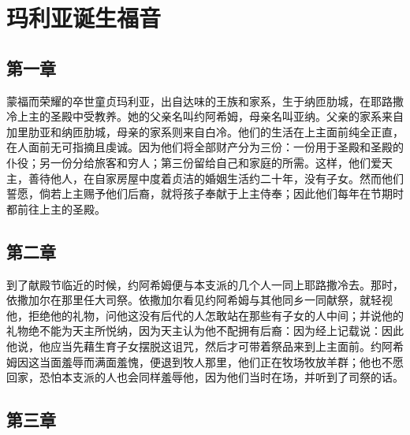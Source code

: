 
\chapter{玛利亚诞生福音}



\section{第一章}

蒙福而荣耀的卒世童贞玛利亚，出自达味的王族和家系，生于纳匝肋城，在耶路撒冷上主的圣殿中受教养。她的父亲名叫约阿希姆，母亲名叫亚纳。父亲的家系来自加里肋亚和纳匝肋城，母亲的家系则来自白冷。他们的生活在上主面前纯全正直，在人面前无可指摘且虔诚。因为他们将全部财产分为三份：一份用于圣殿和圣殿的仆役；另一份分给旅客和穷人；第三份留给自己和家庭的所需。这样，他们爱天主，善待他人，在自家房屋中度着贞洁的婚姻生活约二十年，没有子女。然而他们誓愿，倘若上主赐予他们后裔，就将孩子奉献于上主侍奉；因此他们每年在节期时都前往上主的圣殿。\par


\section{第二章}

到了献殿节临近的时候，约阿希姆便与本支派的几个人一同上耶路撒冷去。那时，依撒加尔在那里任大司祭。依撒加尔看见约阿希姆与其他同乡一同献祭，就轻视他，拒绝他的礼物，问他这没有后代的人怎敢站在那些有子女的人中间；并说他的礼物绝不能为天主所悦纳，因为天主认为他不配拥有后裔：因为经上记载说：因此他说，他应当先藉生育子女摆脱这诅咒，然后才可带着祭品来到上主面前。约阿希姆因这当面羞辱而满面羞愧，便退到牧人那里，他们正在牧场牧放羊群；他也不愿回家，恐怕本支派的人也会同样羞辱他，因为他们当时在场，并听到了司祭的话。\par


\section{第三章}

